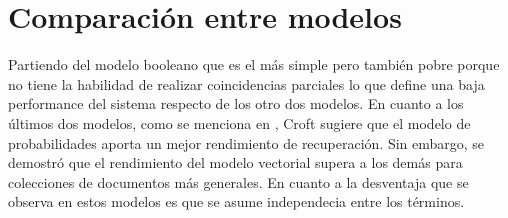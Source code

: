 \section{Comparación entre modelos}

Partiendo del modelo booleano que es el más simple pero también pobre porque no tiene la habilidad de realizar coincidencias parciales lo que define una baja performance del sistema respecto de los otro dos modelos.
En cuanto a los últimos dos modelos, como se menciona en \cite{baeza1999}, Croft sugiere que el modelo de probabilidades aporta un mejor rendimiento de recuperación. Sin embargo, se demostró que el rendimiento del modelo vectorial supera a los demás para colecciones de documentos más generales.
En cuanto a la desventaja que se observa en estos modelos es que se asume independecia entre los términos.